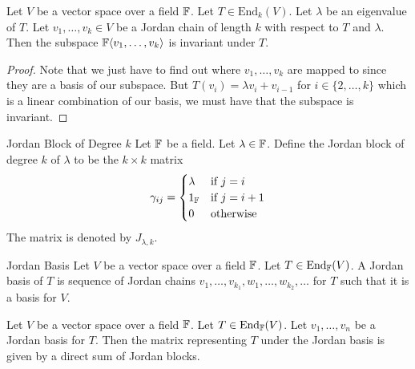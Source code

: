 \documentclass[a4paper]{article}
\begin{document}
\begin{prp}{}{} Let $V$ be a vector space over a field $\mathbb{F}$. Let $T\in\text{End}_k(V)$. Let $\lambda$ be an eigenvalue of $T$. Let $v_1,\dots,v_k\in V$ be a Jordan chain of length $k$ with respect to $T$ and $\lambda$. Then the subspace $\mathbb{F}\langle v_1,\dots,v_k\rangle$ is invariant under $T$. 
\begin{proof}
Note that we just have to find out where $v_1,\dots,v_k$ are mapped to since they are a basis of our subspace. But $T(v_i)=\lambda v_i+v_{i-1}$ for $i\in\{2,\dots,k\}$ which is a linear combination of our basis, we must have that the subspace is invariant. 
\end{proof}
\end{prp}

\begin{defn}{Jordan Block of Degree $k$}{} Let $\mathbb{F}$ be a field. Let $\lambda\in\mathbb{F}$. Define the Jordan block of degree $k$ of $\lambda$ to be the $k\times k$ matrix $$
\gamma_{ij}=\begin{cases}
\lambda & \text{if $j=i$}\\
1_{\mathbb{F}} & \text{if $j=i+1$}\\
0 & \text{otherwise}
\end{cases}$$
The matrix is denoted by $J_{\lambda,k}$. 
\end{defn}

\begin{defn}{Jordan Basis}{} Let $V$ be a vector space over a field $\mathbb{F}$. Let $T\in\text{End}_{\mathbb{F}}(V)$. A Jordan basis of $T$ is sequence of Jordan chains $v_1,\dots,v_{k_1},w_1,\dots,w_{k_2},\dots$ for $T$ such that it is a basis for $V$. 
\end{defn}

\begin{prp}{}{} Let $V$ be a vector space over a field $\mathbb{F}$. Let $T\in\text{End}_{\mathbb{F}}(V)$. Let $v_1,\dots,v_n$ be a Jordan basis for $T$. Then the matrix representing $T$ under the Jordan basis is given by a direct sum of Jordan blocks. 
\end{prp}
\end{document}
